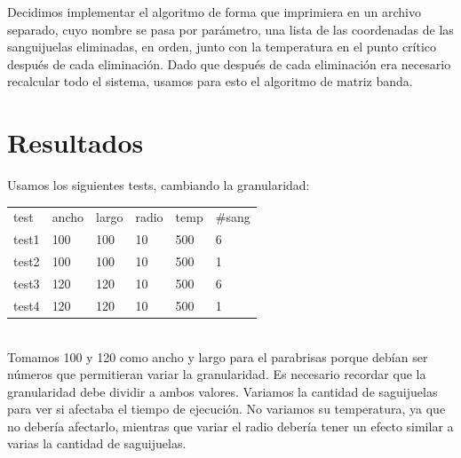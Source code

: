 \documentclass[spanish,a4paper]{article}
\begin{document}
Decidimos implementar el algoritmo de forma que imprimiera en un archivo separado, cuyo nombre se pasa por parámetro, una lista de las coordenadas de las sanguijuelas eliminadas, en orden, junto con la temperatura en el punto crítico después de cada eliminación. Dado que después de cada eliminación era necesario recalcular todo el sistema, usamos para esto el algoritmo de matriz banda. \newline \newline

\newpage

\section{Resultados}
\label{sec:res}

Usamos los siguientes tests, cambiando la granularidad: 
\begin{tabular}{ l l l l l l}
  test & ancho & largo & radio & temp & $\#$sang \\
  test1 & 100 & 100 & 10 & 500 & 6 \\
  test2 & 100 & 100 & 10 & 500 & 1 \\
  test3 & 120 & 120 & 10 & 500 & 6 \\
  test4 & 120 & 120 & 10 & 500 & 1 \\
\end{tabular}   \\
Tomamos 100 y 120 como ancho y largo para el parabrisas porque debían ser números que permitieran variar la granularidad. Es necesario recordar que la granularidad debe dividir a ambos valores. Variamos la cantidad de saguijuelas para ver si afectaba el tiempo de ejecución. No variamos su temperatura, ya que no debería afectarlo, mientras que variar el radio debería tener un efecto similar a varias la cantidad de saguijuelas.
  
\end{document}
